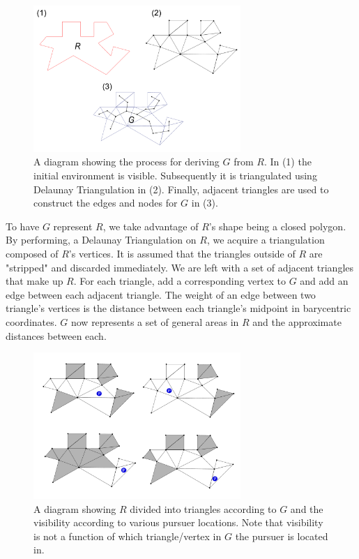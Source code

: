 \documentclass{article}
\begin{document}
\begin{figure}[htb]
\centering
\includegraphics[width=0.7\textwidth]{"trangulation"}
\caption{A diagram showing the process for deriving \(G\) from \(R\). In (1) the initial environment is visible. Subsequently it is triangulated using Delaunay Triangulation in (2). Finally, adjacent triangles are used to construct the edges and nodes for \(G\) in (3).}
\end{figure}

To have \(G\) represent \(R\), we take advantage of \(R\)'s shape being a closed polygon. By performing, a Delaunay Triangulation on \(R\), we acquire a triangulation composed of \(R\)'s vertices. \cite{dTri} It is assumed that the triangles outside of \(R\) are "stripped" and discarded immediately. We are left with a set of adjacent triangles that make up \(R\). For each triangle, add a corresponding vertex to \(G\) and add an edge between each adjacent triangle. The weight of an edge between two triangle's vertices is the distance between each triangle's midpoint in barycentric coordinates. \cite{bCenter} \(G\) now represents a set of general areas in \(R\) and the approximate distances between each.

\begin{figure}[htb]
\centering
\includegraphics[width=0.7\textwidth]{"visibility"}
\caption{A diagram showing \(R\) divided into triangles according to \(G\) and the visibility according to various pursuer locations. Note that visibility is not a function of which triangle/vertex in \(G\) the pursuer is located in.}
\end{figure}
\end{document}
